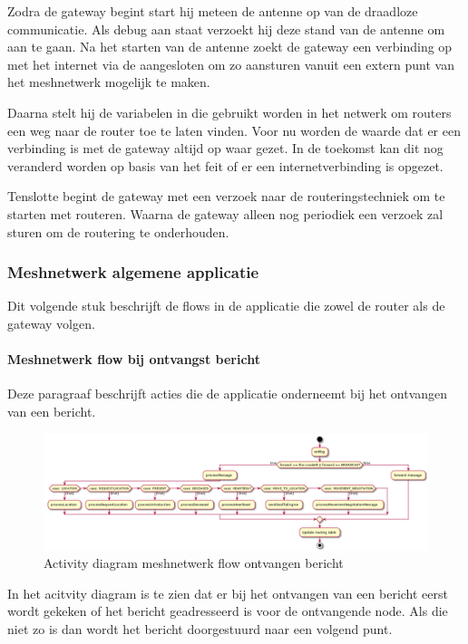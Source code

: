 \documentclass[a4paper, 11pt, oneside]{report}
\begin{document}
Zodra de gateway begint start hij meteen de antenne op van de draadloze communicatie.
Als debug aan staat verzoekt hij deze stand van de antenne om aan te gaan.
Na het starten van de antenne zoekt de gateway een verbinding op met het internet via de aangesloten  om zo aansturen vanuit een extern punt van het meshnetwerk mogelijk te maken.

Daarna stelt hij de variabelen in die gebruikt worden in het netwerk om routers een weg naar de router toe te laten vinden. Voor nu worden de waarde dat er een verbinding is met de gateway altijd op waar gezet. In de toekomst kan dit nog veranderd worden op basis van het feit of er een internetverbinding is opgezet. 

Tenslotte begint de gateway met een verzoek naar de routeringstechniek om te starten met routeren. Waarna de gateway alleen nog periodiek een verzoek zal sturen om de routering te onderhouden.

\subsubsection{Meshnetwerk algemene applicatie}
Dit volgende stuk beschrijft de flows in de applicatie die zowel de router als de gateway volgen. 

\paragraph{Meshnetwerk flow bij ontvangst bericht}
\label{DetailedDesign:Communicatie:Activity:meshcomponent:onmsg}
Deze paragraaf beschrijft acties die de applicatie onderneemt bij het ontvangen van een bericht. 
\begin{figure}[H]
	\begin{center}\includegraphics[width=.8\linewidth]{UML/out/Communication/activity/processMessage/processMessage.png}\end{center}
	\caption{Activity diagram meshnetwerk flow ontvangen bericht}
	\label{fig:communication:meshcomponent:onmsg}
\end{figure}

In het acitvity diagram is te zien dat er bij het ontvangen van een bericht eerst wordt gekeken of het bericht geadresseerd is voor de ontvangende node.
Als die niet zo is dan wordt het bericht doorgestuurd naar een volgend punt.
\end{document}
